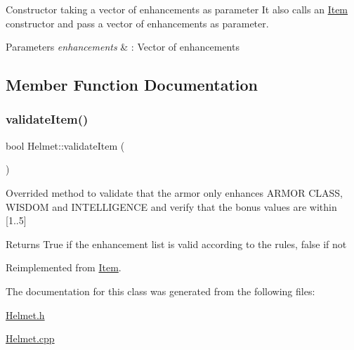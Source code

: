 Constructor taking a vector of enhancements as parameter It also calls an \hyperlink{class_item}{Item} constructor and pass a vector of enhancements as parameter. 
\begin{DoxyParams}{Parameters}
{\em enhancements} & \+: Vector of enhancements \\
\hline
\end{DoxyParams}


\subsection{Member Function Documentation}
\hypertarget{class_helmet_aa840a7be0b69b5b3d60398c22d00537f}{}\label{class_helmet_aa840a7be0b69b5b3d60398c22d00537f} 
\subsubsection{\texorpdfstring{validate\+Item()}{validateItem()}}
{\footnotesize\ttfamily bool Helmet\+::validate\+Item (\begin{DoxyParamCaption}{ }\end{DoxyParamCaption})\hspace{0.3cm}{\ttfamily [virtual]}}

Overrided method to validate that the armor only enhances \textquotesingle{}A\+R\+M\+OR C\+L\+A\+SS\textquotesingle{}, \textquotesingle{}W\+I\+S\+D\+OM\textquotesingle{} and \textquotesingle{}I\+N\+T\+E\+L\+L\+I\+G\+E\+N\+CE\textquotesingle{} and verify that the bonus values are within \mbox{[}1..5\mbox{]} \begin{DoxyReturn}{Returns}
True if the enhancement list is valid according to the rules, false if not 
\end{DoxyReturn}


Reimplemented from \hyperlink{class_item_a6603371b60aaded48f697975c81fc25b}{Item}.



The documentation for this class was generated from the following files\+:\begin{DoxyCompactItemize}
\item 
\hyperlink{_helmet_8h}{Helmet.\+h}\item 
\hyperlink{_helmet_8cpp}{Helmet.\+cpp}\end{DoxyCompactItemize}

